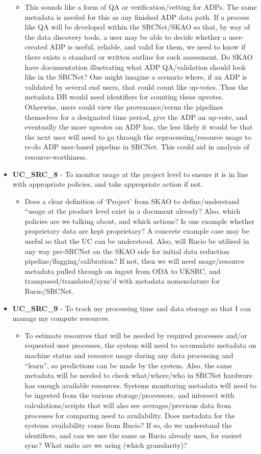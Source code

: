 \begin{itemize}[label={}]
\begin{itemize}[label={}]
        \item This sounds like a form of QA or verification/vetting for ADPs.  The same metadata is needed for this as any finished ADP data path.  If a process like QA will be developed within the SRCNet/SKAO so that, by way of the data discovery tools, a user may be able to decide whether a user-created ADP is useful, reliable, and valid for them, we need to know if there exists a standard or written outline for such assessment.  Do SKAO have documentation illustrating what ADP QA/validation should look like in the SRCNet?  One might imagine a scenario where, if an ADP is validated by several end users, that could count like up-votes.  Thus the metadata DB would need identifiers for counting these upvotes.  Otherwise, users could view the provenance/rerun the pipelines themselves for a designated time period, give the ADP an up-vote, and eventually the more upvotes an ADP has, the less likely it would be that the next user will need to go through the reprocessing/resource usage to re-do ADP user-based pipeline in SRCNet.  This could aid in analysis of resource-worthiness.
    \end{itemize}
    \item {\bf UC\_SRC\_8} - To monitor usage at the project level to ensure it is in line with appropriate policies, and take appropriate action if not.
    \begin{itemize}[label={}]
        \item Does a clear definition of ‘Project’ from SKAO to define/understand “usage at the product level exist in a document already?  Also, which policies are we talking about, and which actions?  Is one example whether proprietary data are kept proprietary?  A concrete example case may be useful so that the UC can be understood.  Also, will Rucio be utilised in any way pre-SRCNet on the SKAO side for initial data reduction pipeline/flagging/calibration?  If not, then we will need usage/resource metadata pulled through on ingest from ODA to UKSRC, and transposed/translated/sync’d with metadata nomenclature for Rucio/SRCNet.  
    \end{itemize}
    \item {\bf UC\_SRC\_9} - To track my processing time and data storage so that I can manage my compute resources.
    \begin{itemize}[label={}]
        \item To estimate resources that will be needed by required processes and/or requested user processes, the system will need to accumulate metadata on machine status and resource usage during any data processing and “learn”, so predictions can be made by the system.  Also, the same metadata will be needed to check what/where/who in SRCNet hardware has enough available resources. Systems monitoring metadata will need to be ingested from the various storage/processors, and intersect with calculations/scripts that will also see averages/previous data from processes for comparing need to availability.  Does metadata for the systems availability come from Rucio?  If so, do we understand the identifiers, and can we use the same as Rucio already uses, for easiest sync?  What units are we using (which granularity)?

\end{itemize}
\end{itemize}
